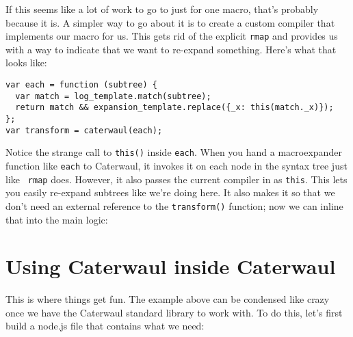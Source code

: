 \documentclass{report}
\begin{document}
    If this seems like a lot of work to go to just for one macro, that's probably because it is. A simpler way to go about it is to create a custom compiler that implements our macro for us.
    This gets rid of the explicit {\tt rmap} and provides us with a way to indicate that we want to re-expand something. Here's what that looks like:

\begin{verbatim}
var each = function (subtree) {
  var match = log_template.match(subtree);
  return match && expansion_template.replace({_x: this(match._x)});
};
var transform = caterwaul(each);
\end{verbatim}

    Notice the strange call to {\tt this()} inside {\tt each}. When you hand a macroexpander function like {\tt each} to Caterwaul, it invokes it on each node in the syntax tree just like {\tt
    rmap} does. However, it also passes the current compiler in as {\tt this}. This lets you easily re-expand subtrees like we're doing here. It also makes it so that we don't need an external
    reference to the {\tt transform()} function; now we can inline that into the main logic:


\section{Using Caterwaul inside Caterwaul}
    This is where things get fun. The example above can be condensed like crazy once we have the Caterwaul standard library to work with. To do this, let's first build a node.js file that
    contains what we need:
\end{document}
